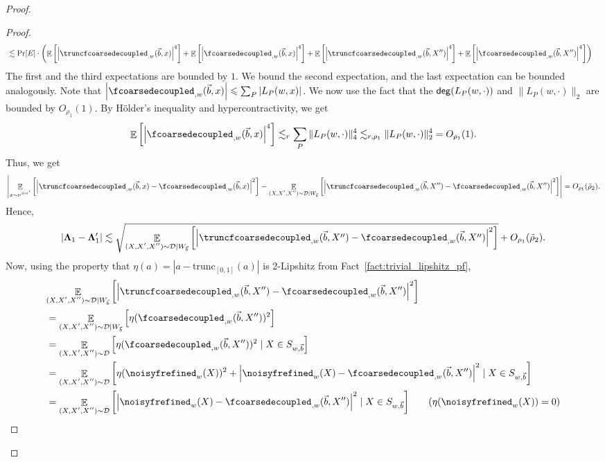\documentclass[11pt]{article}
\newcommand\card[1]{\left| {#1} \right|}
\newcommand\Expect[2]{{\mathop{\mathbb{E}}_{#1}\left[ {#2} \right]}}
\renewcommand\leq{\leqslant}
\newcommand{\V}[1]{{#1}}
\begin{document}
\begin{proof}
\begin{proof}
\begin{align*}
          &\lesssim \Pr[E]\cdot \left(\Expect{}{\card{\truncfcoarsedecoupled_{,\V w}(\vec{b},\V x)}^4} + \Expect{}{ \card{\fcoarsedecoupled_{,\V w}(\vec{b},\V x) }^4} +\Expect{}{\card{\truncfcoarsedecoupled_{,\V w}(\vec{b},\V X'')}^4} + \Expect{}{\card{\fcoarsedecoupled_{,\V w}(\vec{b},\V X'') }^4}\right)
      \end{align*}
      The first and the third expectations are bounded by $1$. We bound the second expectation, and the last expectation can be bounded analogously. Note that $\card{\fcoarsedecoupled_{,\V w}(\vec{b},\V x) } \leq \sum_{P} \card{L_P(w,x)}$. We now use the fact that the ${\sf deg}(L_P(w,\cdot))$ and $\|L_P(w,\cdot)\|_2$ are bounded by $O_{\rho_1}(1)$. By H\"older's inequality and hypercontractivity, we get
      $$\Expect{}{ \card{\fcoarsedecoupled_{,\V w}(\vec{b},\V x) }^4} \lesssim_r \sum_P \|L_P(w,\cdot)\|_4^4 \lesssim_{r, \rho_1} \|L_P(w,\cdot)\|_2^4 = O_{\rho_1}(1).$$
      Thus, we get
      $$\card{\Expect{\substack{\V x\sim \nu^{\otimes n'}}}{\card{\truncfcoarsedecoupled_{,\V w}(\vec{b},\V x) - \fcoarsedecoupled_{,\V w}(\vec{b},\V x) }^2} -\Expect{\substack{(X, X', X'')\sim \mathcal{D}|W_{\vec{b}}}}{\card{\truncfcoarsedecoupled_{,\V w}(\vec{b},\V X'') - \fcoarsedecoupled_{,\V w}(\vec{b},\V X'') }^2} } = O_{\rho_1}(\tilde{\rho}_2).$$
      Hence,
    $$\card{\mathbf{\Lambda}_1 -  \mathbf{\Lambda}'_1 } \lesssim \sqrt{\Expect{\substack{(X, X', X'')\sim \mathcal{D}|W_{\vec{b}}}}{\card{\truncfcoarsedecoupled_{,\V w}(\vec{b}, X'') - \fcoarsedecoupled_{,\V w}(\vec{b}, X'') }^2}}+O_{\rho_1}(\tilde{\rho}_2).$$
    Now, using the property that $\eta(a) = \card{a-\mathrm{trunc}_{[0,1]}(a)}$ is $2$-Lipshitz from Fact~\ref{fact:trivial_lipshitz_pf},
    \begin{align*}
            &\Expect{\substack{(X, X', X'')\sim \mathcal{D}|W_{\vec{b}}}}{\card{\truncfcoarsedecoupled_{,\V w}(\vec{b}, X'') - \fcoarsedecoupled_{,\V w}(\vec{b}, X'') }^2} \\
            &= \Expect{\substack{(X, X', X'')\sim \mathcal{D}|W_{\vec{b}}}}{\eta(\fcoarsedecoupled_{,\V w}(\vec{b}, X''))^2}\\
            &= \Expect{\substack{(X, X', X'')\sim \mathcal{D}}}{\eta(\fcoarsedecoupled_{,\V w}(\vec{b}, X''))^2\mid X\in S_{w,\vec{b}}}\\
            &= \Expect{\substack{(X, X', X'')\sim \mathcal{D}}}{\eta(\noisyfrefined_{\V w}(X))^2 + \card{\noisyfrefined_{\V w}(X) - \fcoarsedecoupled_{,\V w}(\vec{b}, X'')}^2\mid X\in S_{w,\vec{b}}}\\
             &= \Expect{\substack{(X, X', X'')\sim \mathcal{D}}}{\card{\noisyfrefined_{\V w}(X) - \fcoarsedecoupled_{,\V w}(\vec{b}, X'')}^2\mid X\in S_{w,\vec{b}}} \tag*{($\eta(\noisyfrefined_{\V w}(X)) = 0$)}

\end{align*}
\end{proof}
\end{proof}
\end{document}
